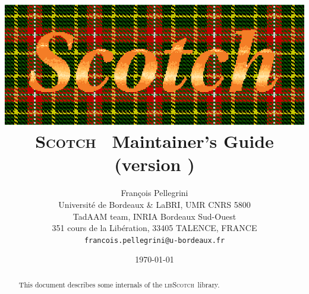 \documentclass{article}
\newcommand{\scotch}{\textsc{Scotch}\xspace}     %
\newcommand{\libscotch}{\textsc{libScotch}\xspace} %
\begin{document}
\date{\today}

\title{\includegraphics{../misc/scotch_logo_color.ps}\\[1em]
       {\LARGE\bf \scotch\ \textsc{\scotchver} Maintainer's Guide}\\[1em]%
       {\normalsize (version \scotchversub)}
}

\author{Fran\c cois Pellegrini\\
Universit\'e de Bordeaux \& LaBRI, UMR CNRS 5800\\
TadAAM team, INRIA Bordeaux Sud-Ouest\\
351 cours de la Lib\'eration, 33405 TALENCE, FRANCE\\
{\tt francois.pellegrini@u-bordeaux.fr}}

\maketitle

\begin{abstract}
This document describes some internals of the \libscotch\
library.
\end{abstract}

\clearpage

\tableofcontents

\end{document}

